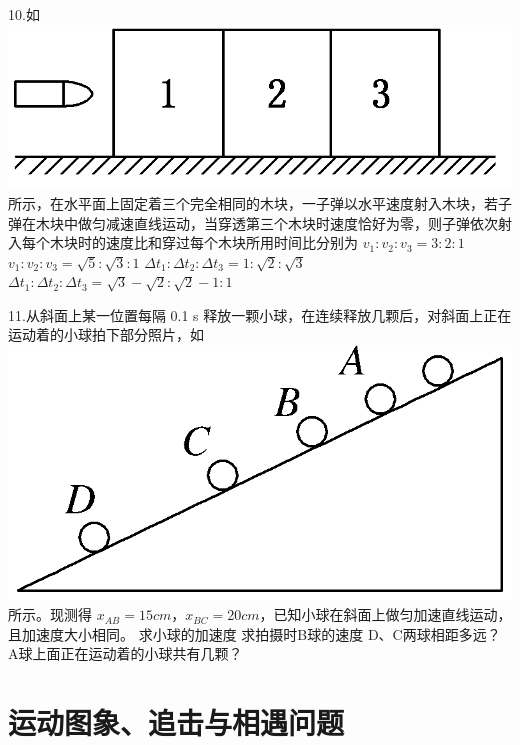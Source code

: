 \documentclass[a4paper,fontset = windows]{ctexbook} %
\begin{document}
\begin{xuanze}
10.如
\includegraphics{../picture/1-2/004.png}
所示，在水平面上固定着三个完全相同的木块，一子弹以水平速度射入木块，若子弹在木块中做匀减速直线运动，当穿透第三个木块时速度恰好为零，则子弹依次射入每个木块时的速度比和穿过每个木块所用时间比分别为
\choice[A] $v_1:v_2:v_3=3:2:1$
\choice[B] $v_1:v_2:v_3=\sqrt{5}:\sqrt{3}:1$
\choice[C] $\Delta t_1:\Delta t_2:\Delta t_3 =1:\sqrt{2}:\sqrt{3}$
\choice[D] $\Delta t_1:\Delta t_2:\Delta t_3 =\sqrt{3}-\sqrt{2}:\sqrt{2}-1:1$

\end{xuanze}

\begin{jisuan}
11.从斜面上某一位置每隔 0.1 s 释放一颗小球，在连续释放几颗后，对斜面上正在运动着的小球拍下部分照片，如
\includegraphics{../picture/1-2/005.png}
所示。现测得 $x_{AB}=15 cm$，$x_{BC}=20 cm$，已知小球在斜面上做匀加速直线运动，且加速度大小相同。
\qitem 求小球的加速度
\qitem 求拍摄时B球的速度
\qitem D、C两球相距多远？
\qitem A球上面正在运动着的小球共有几颗？

\end{jisuan}

\section{运动图象、追击与相遇问题}
\end{document}
